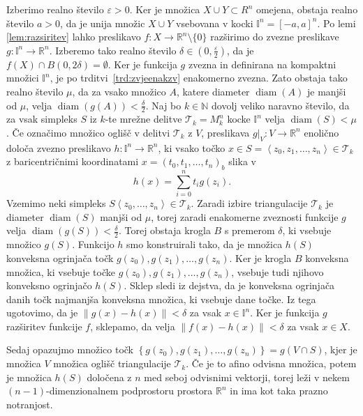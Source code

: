 \documentclass[mat1]{fmfdelo}
\newcommand{\R}{\mathbb R}
\newcommand{\N}{\mathbb N}
\DeclareMathOperator{\diam}{diam}
\newcommand{\I}{\mathbb I}
\newcommand{\0}{0}
\newcommand{\pT}{\mathcal T}
\begin{document}
\begin{dokaz}
Izberimo realno število $\varepsilon > 0$. Ker je množica $X \cup Y \subset R^n$ omejena, obstaja realno število $a > 0$, da je unija množic $X \cup Y$ vsebovana v kocki $\I^n = \left [ -a, a \right ]^n$. Po lemi \ref{lem:razsiritev} lahko preslikavo $f : X \to \R^n \setminus \{ \0 \}$ razširimo do zvezne preslikave $g : \I^n \to \R^n$. Izberemo tako realno število $\delta \in (0, \frac{\varepsilon}{2})$, da je $f(X) \cap B( \0, 2\delta) = \emptyset$. Ker je funkcija $g$ zvezna in definirana na kompaktni množici $\I^n$, je po trditvi~\ref{trd:zvjeenakzv} enakomerno zvezna. Zato obstaja tako realno število $\mu$, da za vsako množico $A$, katere diameter $\diam(A)$ je manjši od $\mu$, velja $\diam(g(A)) < \frac{\delta}{2}$. Naj bo $k \in \N$ dovolj veliko naravno število, da za vsak simpleks $S$ iz $k$-te mrežne delitve $\pT_k = M_k^n$ kocke $\I^n$ velja $\diam(S) < \mu$. Če označimo množico oglišč v delitvi $\pT_k$ z $V$, preslikava $g|_V : V \to \R^n$ enolično določa zvezno preslikavo $h : \I^n \to \R^n$, ki vsako točko $x \in S = \left < z_0, z_1, \dots, z_n \right > \in \pT_k$ z baricentričnimi koordinatami $x = (t_0, t_1, \dots, t_n)_b$ slika v 
$$h(x) = \sum_{i=0}^n t_i g(z_i).$$
Vzemimo neki simpleks $S \left < z_0, \dots, z_n \right > \in \pT_k$. Zaradi izbire triangulacije $\pT_k$ je diameter $\diam(S)$ manjši od $\mu$, torej zaradi enakomerne zveznosti funkcije $g$ velja $\diam (g(S)) < \frac{\delta}{2}$. Torej obstaja krogla $B$ s premerom $\delta$, ki vsebuje množico $g(S)$. Funkcijo $h$ smo konstruirali tako, da je množica $h(S)$ konveksna ogrinjača točk $g(z_0), g(z_1), \dots, g(z_n)$. Ker je krogla $B$ konveksna množica, ki vsebuje točke $g(z_0), g(z_1), \dots, g(z_n)$, vsebuje tudi njihovo konveksno ogrinjačo $h(S)$. Sklep sledi iz dejstva, da je konveksna ogrinjača danih točk najmanjša konveksna množica, ki vsebuje dane točke. Iz tega ugotovimo, da je $\| g(x) - h(x) \| < \delta$ za vsak $x \in \I^n$. Ker je funkcija $g$ razširitev funkcije $f$, sklepamo, da velja $\| f(x) - h(x) \| < \delta$ za vsak $x \in X$.

Sedaj opazujmo množico točk $\left \{ g(z_0), g(z_1), \dots, g(z_n) \right \} = g(V \cap S)$, kjer je množica $V$ množica oglišč triangulacije $\pT_k$. Če je to afino odvisna množica, potem je množica $h(S)$ določena z $n$ med seboj odvisnimi vektorji, torej leži v nekem $(n-1)$-dimenzionalnem podprostoru prostora $\R^n$ in ima kot taka prazno notranjost. 


\end{dokaz}
\end{document}
